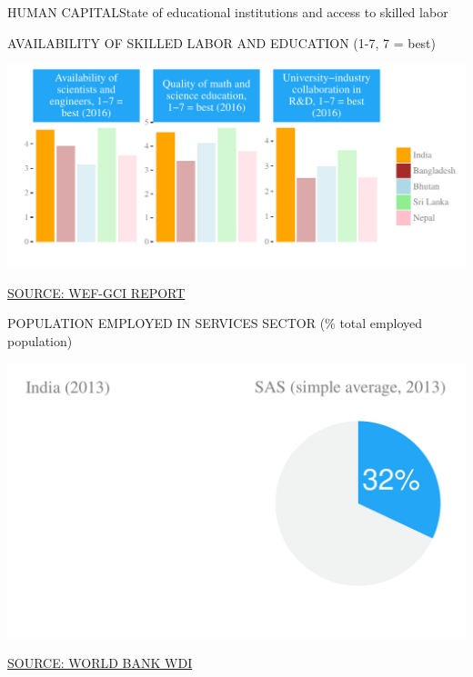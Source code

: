 \documentclass{article}\usepackage[]{graphicx}\usepackage[]{color}
\makeatletter
\def\maxwidth{ %
  \ifdim\Gin@nat@width>\linewidth
    \linewidth
  \else
    \Gin@nat@width
  \fi
}
\makeatother
\begin{document}
\begin{minipage}[b]{0.95\textwidth}
   \vspace{5ex}
   \begin{flushleft}  
     \hspace{4ex}\Large{\textcolor[HTML]{22A6F5}{HUMAN CAPITAL}}\hspace{2ex}\small{\textcolor[HTML]{818181}{State of educational institutions and access to skilled labor}}
   \end{flushleft} 
  \begin{minipage}[c]{0.55\textwidth} %
    \hspace{4ex}\small{\textcolor[HTML]{818181}{AVAILABILITY OF SKILLED LABOR AND EDUCATION
(1-7, 7 = best)}}
    \vspace{1ex}


\hfill{}\includegraphics[width=\maxwidth]{figure/bar_facewrap_chart_Human-1} 



    \hspace{4ex}\scriptsize{\href{NA}{\textcolor[HTML]{22A6F5}{SOURCE: WEF-GCI REPORT}}}
  \end{minipage}
  \begin{minipage}[c]{0.43\textwidth} %
    \small{\textcolor[HTML]{818181}{POPULATION EMPLOYED IN SERVICES SECTOR (\% total employed population)}}
    \vspace{-2ex}


{\centering \includegraphics[width=\maxwidth]{figure/pie_chart_double_Human-1} 

}



    \vspace{-1ex} 
    \scriptsize{\href{NA}{\textcolor[HTML]{22A6F5}{SOURCE: WORLD BANK WDI}}}
  \end{minipage}
\end{minipage}  
\end{document}
